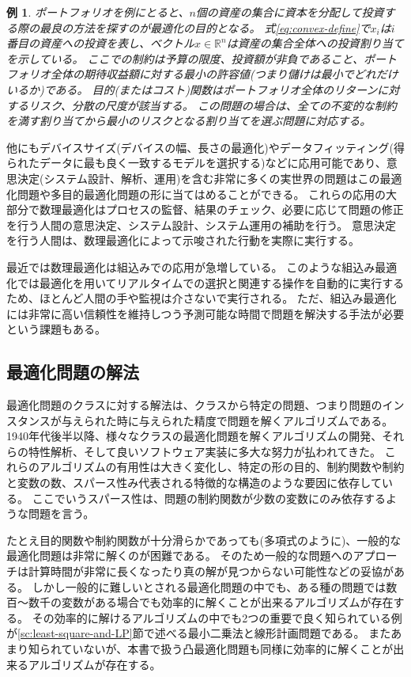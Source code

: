 \documentclass[a4paper, 10pt, uplatex]{jsreport}
\newtheorem{example}{例}
\begin{document}
\begin{example}
ポートフォリオを例にとると、$n$個の資産の集合に資本を分配して投資する際の最良の方法を探すのが最適化の目的となる。
式\eqref{eq:convex-define}で$x_i$は$i$番目の資産への投資を表し、ベクトル$x \in \mathbb{R}^n$は資産の集合全体への投資割り当てを示している。
ここでの制約は予算の限度、投資額が非負であること、ポートフォリオ全体の期待収益額に対する最小の許容値(つまり儲けは最小でどれだけいるか)である。
目的(またはコスト)関数はポートフォリオ全体のリターンに対するリスク、分散の尺度が該当する。
この問題の場合は、全ての不変的な制約を満す割り当てから最小のリスクとなる割り当てを選ぶ問題に対応する。
\end{example}
他にもデバイスサイズ(デバイスの幅、長さの最適化)やデータフィッティング(得られたデータに最も良く一致するモデルを選択する)などに応用可能であり、意思決定(システム設計、解析、運用)を含む非常に多くの実世界の問題はこの最適化問題や多目的最適化問題の形に当てはめることができる。
これらの応用の大部分で数理最適化はプロセスの監督、結果のチェック、必要に応じて問題の修正を行う人間の意思決定、システム設計、システム運用の補助を行う。
意思決定を行う人間は、数理最適化によって示唆された行動を実際に実行する。

最近では数理最適化は組込みでの応用が急増している。
このような組込み最適化では最適化を用いてリアルタイムでの選択と関連する操作を自動的に実行するため、ほとんど人間の手や監視は介さないで実行される。
ただ、組込み最適化には非常に高い信頼性を維持しつう予測可能な時間で問題を解決する手法が必要という課題もある。

\subsection{最適化問題の解法}
最適化問題のクラスに対する解法は、クラスから特定の問題、つまり問題のインスタンスが与えられた時に与えられた精度で問題を解くアルゴリズムである。
1940年代後半以降、様々なクラスの最適化問題を解くアルゴリズムの開発、それらの特性解析、そして良いソフトウェア実装に多大な努力が払われてきた。
これらのアルゴリズムの有用性は大きく変化し、特定の形の目的、制約関数や制約と変数の数、スパース性み代表される特徴的な構造のような要因に依存している。
ここでいうスパース性は、問題の制約関数が少数の変数にのみ依存するような問題を言う。

たとえ目的関数や制約関数が十分滑らかであっても(多項式のように)、一般的な最適化問題は非常に解くのが困難である。
そのため一般的な問題へのアプローチは計算時間が非常に長くなったり真の解が見つからない可能性などの妥協がある。
しかし一般的に難しいとされる最適化問題の中でも、ある種の問題では数百〜数千の変数がある場合でも効率的に解くことが出来るアルゴリズムが存在する。
その効率的に解けるアルゴリズムの中でも2つの重要で良く知られている例が\ref{sc:least-square-and-LP}節で述べる最小二乗法と線形計画問題である。
またあまり知られていないが、本書で扱う凸最適化問題も同様に効率的に解くことが出来るアルゴリズムが存在する。
\end{document}
